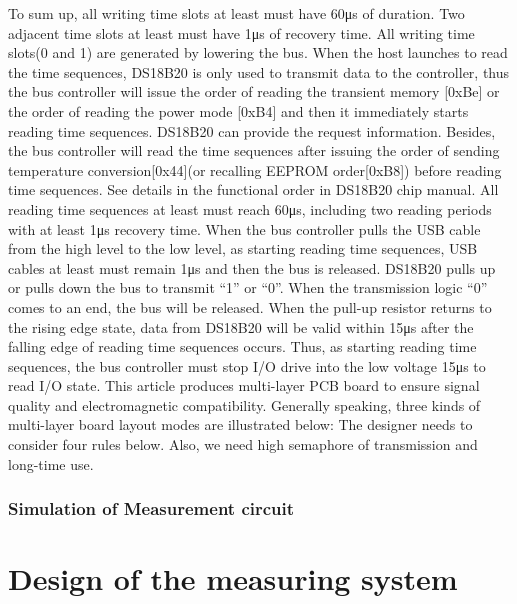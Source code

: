 To sum up, all writing time slots at least must have 60μs of duration. Two adjacent time slots at least must have 1μs of recovery time. All writing time slots(0 and 1) are generated by lowering the bus. 
When the host launches to read the time sequences, DS18B20 is only used to transmit data to the controller, thus the bus controller will issue the order of reading the transient memory [0xBe] or the order of reading the power mode [0xB4] and then it immediately starts reading time sequences. DS18B20 can provide the request information. Besides, the bus controller will read the time sequences after issuing the order of sending temperature conversion[0x44](or recalling EEPROM order[0xB8]) before reading time sequences. See details in the functional order in DS18B20 chip manual. 
All reading time sequences at least must reach 60μs, including two reading periods with at least 1μs recovery time. When the bus controller pulls the USB cable from the high level to the low level, as starting reading time sequences, USB cables at least must remain 1μs and then the bus is released. DS18B20 pulls up or pulls down the bus to transmit “1” or “0”. When the transmission logic “0” comes to an end, the bus will be released. When the pull-up resistor returns to the rising edge state, data from DS18B20 will be valid within 15μs after the falling edge of reading time sequences occurs. Thus, as starting reading time sequences, the bus controller must stop I/O drive into the low voltage 15μs to read I/O state. 
This article produces multi-layer PCB board to ensure signal quality and electromagnetic compatibility. Generally speaking, three kinds of multi-layer board layout modes are illustrated below: 
The designer needs to consider four rules below. 
Also, we need high semaphore of transmission and long-time use. 


\subsection{Simulation of Measurement circuit}
\label{sec:Simulation of Measurement circuit}

\section{ }
\label{sec: }

\chapter{Design of the measuring system}
\label{chap:Design of the measuring system}


